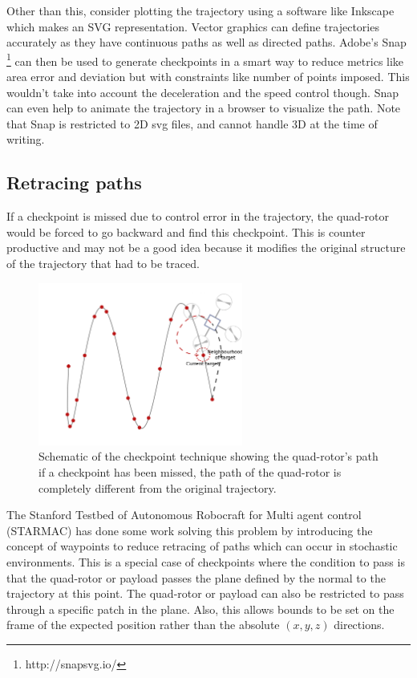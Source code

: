 \documentclass[hidelinks,BTech]{iitmdiss}
\begin{document}
Other than this, consider plotting the trajectory using a software like Inkscape which makes an SVG representation. Vector graphics can define trajectories accurately as they have continuous paths as well as directed paths. Adobe's Snap \footnote{http://snapsvg.io/} can then be used to generate checkpoints in a smart way to reduce metrics like area error and deviation but with constraints like number of points imposed. This wouldn't take into account the deceleration and the speed control though. Snap can even help to animate the trajectory in a browser to visualize the path. Note that Snap is restricted to 2D svg files, and cannot handle 3D at the time of writing.

\subsection{Retracing paths}
If a checkpoint is missed due to control error in the trajectory, the quad-rotor would be forced to go backward and find this checkpoint. This is counter productive and may not be a good idea because it modifies the original structure of the trajectory that had to be traced.


\begin{figure}[H]
  \centering
    \includegraphics[width=0.6\textwidth]{checkpoint_con.png}
    \caption{Schematic of the checkpoint technique showing the quad-rotor's path if a checkpoint has been missed, the path of the quad-rotor is completely different from the original trajectory.}
\end{figure}

The Stanford Testbed of Autonomous Robocraft for Multi agent control (STARMAC) \cite{STARMAC} has done some work solving this problem by introducing the concept of waypoints to reduce retracing of paths which can occur in stochastic environments. This is a special case of checkpoints where the condition to pass is that the quad-rotor or payload passes the plane defined by the normal to the trajectory at this point. The quad-rotor or payload can also be restricted to pass through a specific patch in the plane. Also, this allows bounds to be set on the frame of the expected position rather than the absolute $(x, y, z)$ directions.
\end{document}
